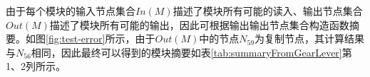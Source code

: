 

由于每个模块的输入节点集合$ In(M) $描述了模块所有可能的读入、输出节点集合$ Out(M) $描述了模块所有可能的输出，因此可根据输出输出节点集合构造函数摘要。如图\ref{fig:test-error}所示，由于$ Out(M) $中的节点$ N_{59} $为复制节点，其计算结果与$ N_{56} $相同，因此最终可以得到的模块摘要如表\ref{tab:summaryFromGearLever}第1、2列所示。

